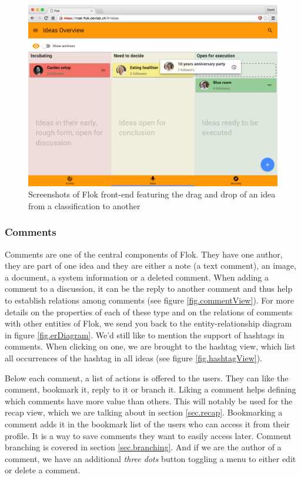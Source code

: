\documentclass[a4paper,12pt, oneside]{article}
\begin{document}
\begin{figure}[!htb]
    \centering
    \includegraphics[width=\textwidth]{images/classificationDragAndDrop.png}
    \caption{Screenshots of Flok front-end featuring the drag and drop of an idea from a classification to another}
    \label{fig.classificationDragAndDrop}
\end{figure}

\FloatBarrier
\subsubsection{Comments}
\label{sec.comments}
Comments are one of the central components of Flok.
They have one author, they are part of one idea and they are either a note (a text comment), an image, a document, a system information or a deleted comment.
When adding a comment to a discussion, it can be the reply to another comment and thus help to establish relations among comments (see figure \ref{fig.commentView}).
For more details on the properties of each of these type and on the relations of comments with other entities of Flok, we send you back to the entity-relationship diagram in figure \ref{fig.erDiagram}.
We'd still like to mention the support of hashtags in comments.
When clicking on one, we are brought to the hashtag view, which list all occurrences of the hashtag in all ideas (see figure \ref{fig.hashtagView}).

Below each comment, a list of actions is offered to the users.
They can like the comment, bookmark it, reply to it or branch it.
Liking a comment helps defining which comments have more value than others.
This will notably be used for the recap view, which we are talking about in section \ref{sec.recap}.
Bookmarking a comment adds it in the bookmark list of the users who can access it from their profile.
It is a way to save comments they want to easily access later.
Comment branching is covered in section \ref{sec.branching}.
And if we are the author of a comment, we have an additional \emph{three dots} button toggling a menu to either edit or delete a comment.
\end{document}
